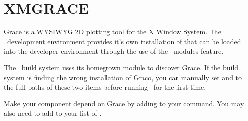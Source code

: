 
\section{XMGRACE}
\label{appsec:grace} 

Grace is a WYSIWYG 2D plotting tool for the X Window System.  The \draco\ development environment provides it's own installation of  that can be loaded into the developer environment through the use of the \draco\ modules feature.

The \draco\ build system uses its homegrown  module to discover Grace.  If the build system is finding the wrong installation of Graco, you can manually set  and  to the full paths of these two items before running \cmake\ for the first time.

Make your component depend on Grace by adding  to your  command.  You may also need to add  to your list of .


%
%
%
%
%
